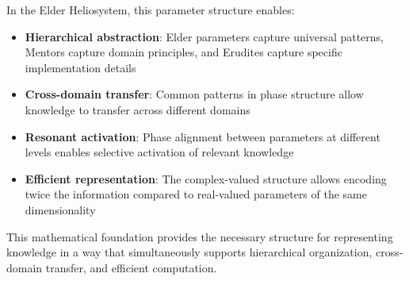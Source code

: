 In the Elder Heliosystem, this parameter structure enables:

\begin{itemize}
    \item \textbf{Hierarchical abstraction}: Elder parameters capture universal patterns, Mentors capture domain principles, and Erudites capture specific implementation details
    
    \item \textbf{Cross-domain transfer}: Common patterns in phase structure allow knowledge to transfer across different domains
    
    \item \textbf{Resonant activation}: Phase alignment between parameters at different levels enables selective activation of relevant knowledge
    
    \item \textbf{Efficient representation}: The complex-valued structure allows encoding twice the information compared to real-valued parameters of the same dimensionality
\end{itemize}

This mathematical foundation provides the necessary structure for representing knowledge in a way that simultaneously supports hierarchical organization, cross-domain transfer, and efficient computation.